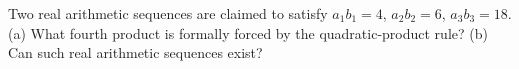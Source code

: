 Two real arithmetic sequences are claimed to satisfy $a_1b_1=4$, $a_2b_2=6$, $a_3b_3=18$. (a) What fourth product is formally forced by the quadratic-product rule? (b) Can such real arithmetic sequences exist?
